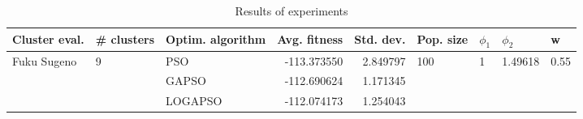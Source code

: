 \begin{table}
\centering
\caption{Results of experiments}
\begin{tabular}{lllrrllll}
\toprule
               Cluster eval. &        \# clusters & Optim. algorithm &  Avg. fitness &  Std. dev. &            Pop. size &         $\phi_{1}$ &               $\phi_{2}$ &                     w \\
\midrule
\multirow{3}{*}{Fuku Sugeno} & \multirow{3}{*}{9} &              PSO &   -113.373550 &   2.849797 & \multirow{3}{*}{100} & \multirow{3}{*}{1} & \multirow{3}{*}{1.49618} & \multirow{3}{*}{0.55} \\
                             &                    &            GAPSO &   -112.690624 &   1.171345 &                      &                    &                          &                       \\
                             &                    &          LOGAPSO &   -112.074173 &   1.254043 &                      &                    &                          &                       \\
\bottomrule
\end{tabular}
\end{table}
